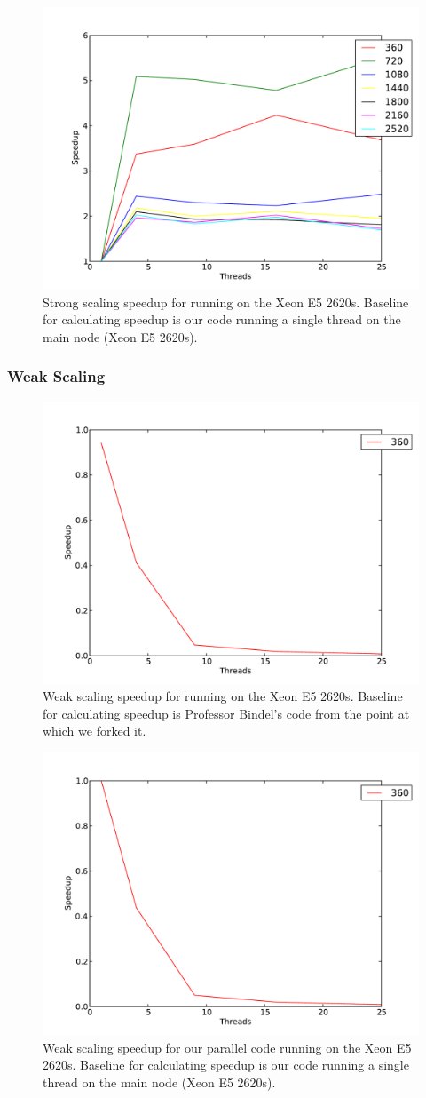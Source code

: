 \begin{figure}[h!]
\includegraphics[width=0.5\linewidth]{e5_strong_e5_baseline.pdf}
\caption{Strong scaling speedup for running on the Xeon E5 2620s. Baseline for calculating speedup is our code running a single thread on the main node (Xeon E5 2620s).}
\end{figure}

\subsubsection{Weak Scaling}
\begin{figure}[h!]
\includegraphics[width=0.5\linewidth]{e5_weak_bindel_baseline.pdf}
\caption{Weak scaling speedup for running on the Xeon E5 2620s. Baseline for calculating speedup is Professor Bindel's code from the point at which we forked it.}
\end{figure}

\begin{figure}[h!]
\includegraphics[width=0.5\linewidth]{e5_weak_e5_baseline.pdf}
\caption{Weak scaling speedup for our parallel code running on the Xeon E5 2620s. Baseline for calculating speedup is our code running a single thread on the main node (Xeon E5 2620s).}
\end{figure}

